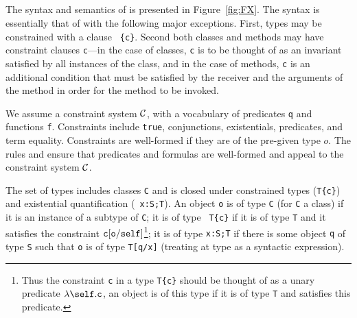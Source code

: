 \subsection{\FXZ{}}

The syntax and semantics of \FXZ{} is presented in Figure~\ref{fig:FX}. 
%
The syntax is essentially that of \FJ{} with the following major
exceptions. First, types may be constrained with a clause {\tt
\{c\}}. Second both classes and methods may have constraint clauses
{\tt c}---in the case of classes, {\tt c} is to be thought of as an
invariant satisfied by all instances of the class, and in the case of
methods, {\tt c} is an additional condition that must be satisfied by
the receiver and the arguments of the method in order for the method to
be invoked.

We assume a constraint system $\cal C$, with a vocabulary of
predicates {\tt q} and functions {\tt f}.
Constraints include {\tt true}, conjunctions, existentials,
predicates, and term equality.
Constraints are well-formed if they are of the pre-given
type $o$.
The rules  and 
ensure that predicates and formulas are well-formed and appeal
to the constraint system $\cal C$.


The set of types includes classes {\tt C} and is closed under
constrained types ({\tt T\{c\}}) and existential quantification ({\tt
x:S;T}). An object {\tt o} is of type {\tt C} (for {\tt C} a class)
if it is an instance of a subtype of {\tt C}; it is of type {\tt
T\{c\}} if it is of type {\tt T} and it satisfies the constraint $\tt
c[o/self]$\footnote{Thus the constraint {\tt c} in a type {\tt T\{c\}}
should be thought of as a unary predicate $\lambda\self.{\tt c}$, an
object is of this type if it is of type {\tt T} and satisfies this
predicate.}; it is of type {\tt x:S;T} if there is some object {\tt q}
of type {\tt S} such that {\tt o} is of type {\tt T[q/x]} (treating at
type as a syntactic expression).

